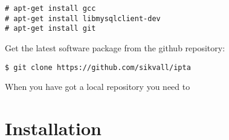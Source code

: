 \documentclass[10pt,a4paper]{report}
\begin{document}
\small
\begin{verbatim}
# apt-get install gcc
# apt-get install libmysqlclient-dev
# apt-get install git
\end{verbatim}
\normalsize

Get the latest software package from the github repository:

\small
\begin{verbatim}
$ git clone https://github.com/sikvall/ipta
\end{verbatim}
\normalsize

When you have got a local repository you need to 

\chapter{Installation}
\end{document}
